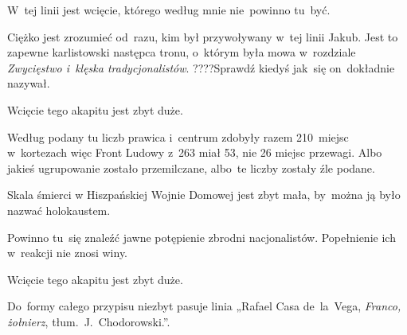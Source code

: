 \documentclass[a4paper,11pt]{article}
\begin{document}
\VerSpaceFour





\noindent
{} W~tej linii jest wcięcie, którego według mnie
nie~powinno tu~być.

\VerSpaceFour





\noindent
{} Ciężko jest zrozumieć od~razu, kim był przywoływany
w~tej linii Jakub. Jest to zapewne karlistowski następca tronu, o~którym
była mowa w~rozdziale \textit{Zwycięstwo i~klęska tradycjonalistów}.
????Sprawdź kiedyś jak~się on~dokładnie nazywał.

\VerSpaceFour





\noindent
{} Wcięcie tego akapitu jest zbyt duże.

\VerSpaceFour





\noindent
{} Według podany tu liczb prawica i~centrum zdobyły razem 210~miejsc
w~kortezach więc Front Ludowy z~263 miał 53, nie 26 miejsc przewagi. Albo
jakieś ugrupowanie zostało przemilczane, albo~te liczby zostały źle podane.

\VerSpaceFour





\noindent
{} Skala śmierci w Hiszpańskiej Wojnie Domowej jest zbyt
mała, by~można ją było nazwać holokaustem.

\VerSpaceFour





\noindent
{} Powinno tu~się znaleźć jawne potępienie zbrodni
nacjonalistów. Popełnienie ich w~reakcji nie znosi winy.

\VerSpaceFour





\noindent
{} Wcięcie tego akapitu jest zbyt duże.

\VerSpaceFour





\noindent
{} Do~formy całego przypisu niezbyt pasuje linia „Rafael
Casa de~la~Vega, \textit{Franco, żołnierz}, tłum.~J.~Chodorowski.”.

\VerSpaceFour
\end{document}

